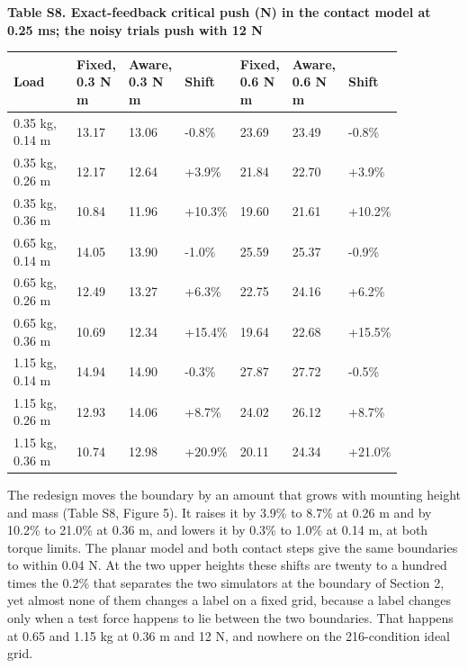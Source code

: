 \documentclass[11pt,a4paper]{article}
\begin{document}
\textbf{Table S8. Exact-feedback critical push (N) in the contact model at 0.25 ms; the noisy trials push with 12 N}
\begin{longtable}{p{0.171\linewidth}p{0.122\linewidth}p{0.122\linewidth}p{0.099\linewidth}p{0.122\linewidth}p{0.122\linewidth}p{0.099\linewidth}}
\toprule
Load & Fixed, 0.3 N m & Aware, 0.3 N m & Shift & Fixed, 0.6 N m & Aware, 0.6 N m & Shift \\ \midrule \endhead
0.35 kg, 0.14 m & 13.17 & 13.06 & -0.8\% & 23.69 & 23.49 & -0.8\% \\
0.35 kg, 0.26 m & 12.17 & 12.64 & +3.9\% & 21.84 & 22.70 & +3.9\% \\
0.35 kg, 0.36 m & 10.84 & 11.96 & +10.3\% & 19.60 & 21.61 & +10.2\% \\
0.65 kg, 0.14 m & 14.05 & 13.90 & -1.0\% & 25.59 & 25.37 & -0.9\% \\
0.65 kg, 0.26 m & 12.49 & 13.27 & +6.3\% & 22.75 & 24.16 & +6.2\% \\
0.65 kg, 0.36 m & 10.69 & 12.34 & +15.4\% & 19.64 & 22.68 & +15.5\% \\
1.15 kg, 0.14 m & 14.94 & 14.90 & -0.3\% & 27.87 & 27.72 & -0.5\% \\
1.15 kg, 0.26 m & 12.93 & 14.06 & +8.7\% & 24.02 & 26.12 & +8.7\% \\
1.15 kg, 0.36 m & 10.74 & 12.98 & +20.9\% & 20.11 & 24.34 & +21.0\% \\
\bottomrule
\end{longtable}
The redesign moves the boundary by an amount that grows with mounting height and mass (Table S8, Figure 5). It raises it by 3.9\% to 8.7\% at 0.26 m and by 10.2\% to 21.0\% at 0.36 m, and lowers it by 0.3\% to 1.0\% at 0.14 m, at both torque limits. The planar model and both contact steps give the same boundaries to within 0.04 N. At the two upper heights these shifts are twenty to a hundred times the 0.2\% that separates the two simulators at the boundary of Section 2, yet almost none of them changes a label on a fixed grid, because a label changes only when a test force happens to lie between the two boundaries. That happens at 0.65 and 1.15 kg at 0.36 m and 12 N, and nowhere on the 216-condition ideal grid.
\end{document}
